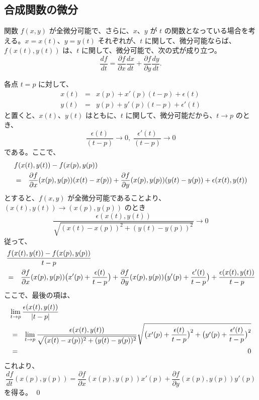 \subsection{合成関数の微分}
\begin{prop} \label{prop:composition}
関数 $f(x,y)$ が全微分可能で、さらに、$x$、$y$ が $t$ の関数となっている場合を考える。$x = x(t)$、$y = y(t)$ それぞれが、$t$ に関して、微分可能ならば、$f(x(t),y(t))$ は、$t$ に関して、微分可能で、次の式が成り立つ。
$$\frac{df}{dt} = \frac{\partial f}{\partial x}\frac{dx}{dt} + \frac{\partial f}{\partial y}\frac{dy}{dt}.$$
\end{prop}
\proof  各点 $t = p$ に対して、
\begin{eqnarray*}
x(t) & = & x(p) + x'(p)(t-p) + \epsilon(t)\\
y(t) & = & y(p) + y'(p)(t-p) + \epsilon'(t)
\end{eqnarray*}
と置くと、$x(t)$、$y(t)$ はともに、$t$ に関して、微分可能だから、$t\to p$ のとき、
$$\frac{\epsilon(t)}{(t-p)} \to 0,\;\frac{\epsilon'(t)}{(t-p)} \to 0$$
である。ここで、
\begin{eqnarray*}
\lefteqn{f(x(t),y(t)) - f(x(p),y(p))}\\
& = & \frac{\partial f}{\partial x}(x(p),y(p))(x(t) - x(p)) + \frac{\partial f}{\partial y}(x(p),y(p))(y(t) - y(p)) + \epsilon(x(t),y(t))
\end{eqnarray*}
とすると、$f(x,y)$ が全微分可能であることより、$(x(t),y(t))\to (x(p),y(p))$ のとき
$$\frac{\epsilon(x(t),y(t))}{\sqrt{(x(t)-x(p))^2 + (y(t) - y(p))^2}} \to 0$$
従って、
\begin{eqnarray*}
\lefteqn{\frac{f(x(t),y(t))-f(x(p),y(p))}{t-p}}\\
& = & \frac{\partial f}{\partial x}(x(p),y(p))\bigl(x'(p) + \frac{\epsilon(t)}{t-p}\bigr) + \frac{\partial f}{\partial y}(x(p),y(p))\bigl(y'(p) + \frac{\epsilon'(t)}{t-p}\bigr) + \frac{\epsilon(x(t),y(t))}{t-p}
\end{eqnarray*}
ここで、最後の項は、
\begin{eqnarray*}
\lefteqn{\lim_{t\to p}\frac{\epsilon(x(t),y(t))}{|t-p|}}\\
& = &
\lim_{t\to p}\frac{\epsilon(x(t),y(t))}{\sqrt{(x(t) - x(p))^2 + (y(t) - y(p))^2}}\sqrt{\bigl(x'(p) + \frac{\epsilon(t)}{t-p}\bigr)^2 + \bigl(y'(p) + \frac{\epsilon'(t)}{t-p}\bigr)^2} \\
& = &0
\end{eqnarray*}
これより、
$$\frac{df}{dt}(x(p),y(p)) = \frac{\partial f}{\partial x}(x(p),y(p))x'(p) + \frac{\partial f}{\partial y}(x(p),y(p))y'(p)$$
を得る。
\qed

